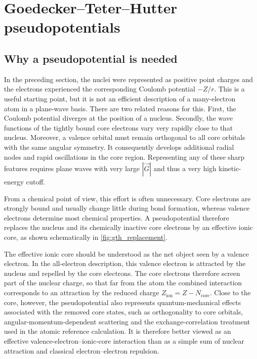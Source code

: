 %
%
%
\section{Goedecker--Teter--Hutter pseudopotentials}
\label{chap:gth}

\subsection{Why a pseudopotential is needed}

In the preceding section, the nuclei were represented as positive point charges and the electrons experienced the corresponding Coulomb potential $-Z/r$. This is a useful starting point, but it is not an efficient description of a many-electron atom in a plane-wave basis. There are two related reasons for this. First, the Coulomb potential diverges at the position of a nucleus. Secondly, the wave functions of the tightly bound core electrons vary very rapidly close to that nucleus. Moreover, a valence orbital must remain orthogonal to all core orbitals with the same angular symmetry. It consequently develops additional radial nodes and rapid oscillations in the core region. Representing any of these sharp features requires plane waves with very large $|\vec{G}|$ and thus a very high kinetic-energy cutoff.

From a chemical point of view, this effort is often unnecessary. Core electrons are strongly bound and usually change little during bond formation, whereas valence electrons determine most chemical properties. A pseudopotential therefore replaces the nucleus and its chemically inactive core electrons by an effective ionic core, as shown schematically in \cref{fig:gth_replacement}.

The effective ionic core should be understood as the net object seen by a valence electron. In the all-electron description, this valence electron is attracted by the nucleus and repelled by the core electrons. The core electrons therefore screen part of the nuclear charge, so that far from the atom the combined interaction corresponds to an attraction by the reduced charge $Z_{\text{ion}}=Z-N_{\text{core}}$. Close to the core, however, the pseudopotential also represents quantum-mechanical effects associated with the removed core states, such as orthogonality to core orbitals, angular-momentum-dependent scattering and the exchange-correlation treatment used in the atomic reference calculation. It is therefore better viewed as an effective valence-electron--ionic-core interaction than as a simple sum of nuclear attraction and classical electron--electron repulsion.

